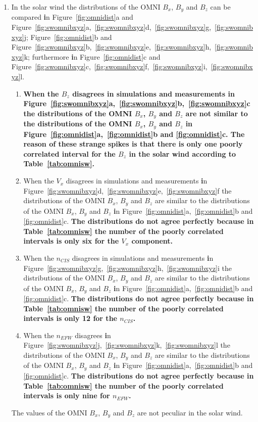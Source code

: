 \documentclass[linenumbers,draft]{agujournal}
\begin{document}
\begin{enumerate}
\item In the solar wind the distributions of the OMNI $B_{x}$, $B_{y}$ and $B_{z}$ can be compared \textbf{i}n Figure~\ref{fig:omnidist}a and Figure~\ref{fig:swomnibxyz}a,~\ref{fig:swomnibxyz}d,~\ref{fig:swomnibxyz}g,~\ref{fig:swomnibxyz}j; Figure~\ref{fig:omnidist}b and Figure~\ref{fig:swomnibxyz}b,~\ref{fig:swomnibxyz}e,~\ref{fig:swomnibxyz}h,~\ref{fig:swomnibxyz}k; furthermore \textbf{i}n Figure~\ref{fig:omnidist}c and Figure~\ref{fig:swomnibxyz}c,~\ref{fig:swomnibxyz}f,~\ref{fig:swomnibxyz}i,~\ref{fig:swomnibxyz}l.
\begin{enumerate}
\item \textbf{When the $B_{z}$ disagrees in simulations and measurements \textbf{i}n Figure~\ref{fig:swomnibxyz}a,~\ref{fig:swomnibxyz}b,~\ref{fig:swomnibxyz}c the distributions of the OMNI $B_{x}$, $B_{y}$ and $B_{z}$ are not similar to the distributions of the OMNI $B_{x}$, $B_{y}$ and $B_{z}$ \textbf{i}n Figure~\ref{fig:omnidist}a,~\ref{fig:omnidist}b and \ref{fig:omnidist}c. The reason of these strange spikes is that there is only one poorly correlated interval for the $B_{z}$ in the solar wind according to Table~\ref{tab:omnisw}.}
\item When the $V_{x}$ disagrees in simulations and measurements \textbf{i}n Figure~\ref{fig:swomnibxyz}d,~\ref{fig:swomnibxyz}e,~\ref{fig:swomnibxyz}f the distributions of the OMNI $B_{x}$, $B_{y}$ and $B_{z}$ are similar to the distributions of the OMNI $B_{x}$, $B_{y}$ and $B_{z}$ \textbf{i}n Figure~\ref{fig:omnidist}a,~\ref{fig:omnidist}b and \ref{fig:omnidist}c. \textbf{The distributions do not agree perfectly because in Table~\ref{tab:omnisw} the number of the poorly correlated intervals is only six for the $V_{x}$ component.}

\item When the $n_{CIS}$ disagrees in simulations and measurements \textbf{i}n Figure~\ref{fig:swomnibxyz}g,~\ref{fig:swomnibxyz}h,~\ref{fig:swomnibxyz}i the distributions of the OMNI $B_{x}$, $B_{y}$ and $B_{z}$ are similar to the distributions of the OMNI $B_{x}$, $B_{y}$ and $B_{z}$ \textbf{i}n Figure~\ref{fig:omnidist}a,~\ref{fig:omnidist}b and \ref{fig:omnidist}c. \textbf{The distributions do not agree perfectly because in Table~\ref{tab:omnisw} the number of the poorly correlated intervals is only 12 for the $n_{CIS}$.}
  
\item When the $n_{EFW}$ disagrees \textbf{i}n Figure~\ref{fig:swomnibxyz}j,~\ref{fig:swomnibxyz}k,~\ref{fig:swomnibxyz}l the distributions of the OMNI $B_{x}$, $B_{y}$ and $B_{z}$ are similar to the distributions of the OMNI $B_{x}$, $B_{y}$ and $B_{z}$ \textbf{i}n Figure~\ref{fig:omnidist}a,~\ref{fig:omnidist}b and \ref{fig:omnidist}c. \textbf{The distributions do not agree perfectly because in Table~\ref{tab:omnisw} the number of the poorly correlated intervals is only nine for $n_{EFW}$.}
\end{enumerate}
The values of the OMNI $B_{x}$, $B_{y}$ and $B_{z}$ are not peculiar in the solar wind.


\end{enumerate}
\end{document}

